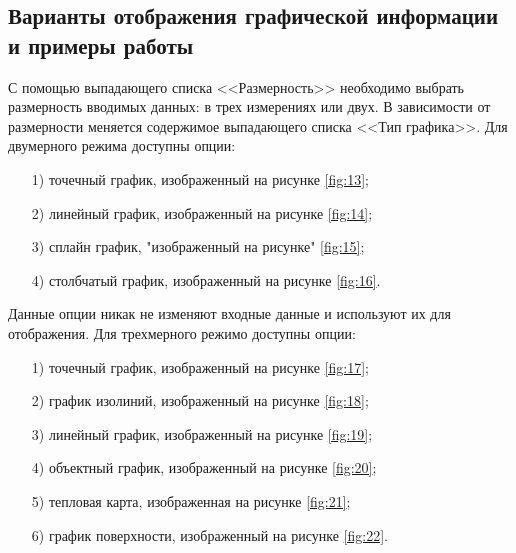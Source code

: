 \subsection{Варианты отображения графической информации и примеры работы}
С помощью выпадающего списка <<Размерность>> необходимо выбрать размерность вводимых данных: в трех измерениях или двух. В зависимости от размерности меняется содержимое выпадающего списка <<Тип графика>>. Для двумерного режима доступны опции:
\begin{enumerate}
    \item [1)] точечный график, изображенный на рисунке \ref{fig:13};
    \item [2)] линейный график, изображенный на рисунке \ref{fig:14};
    \item [3)] сплайн график, "изображенный на рисунке" \ref{fig:15};
    \item [4)] столбчатый график, изображенный на рисунке \ref{fig:16}.
\end{enumerate}

Данные опции никак не изменяют входные данные и используют их для отображения.
Для трехмерного режимо доступны опции:
\begin{enumerate}
    \item [1)] точечный график, изображенный на рисунке \ref{fig:17};
    \item [2)] график изолиний, изображенный на рисунке \ref{fig:18};
    \item [3)] линейный график, изображенный на рисунке \ref{fig:19};
    \item [4)] объектный график, изображенный на рисунке \ref{fig:20};
    \item [5)] тепловая карта, изображенная на рисунке \ref{fig:21};
    \item [6)] график поверхности, изображенный на рисунке \ref{fig:22}.
\end{enumerate}


